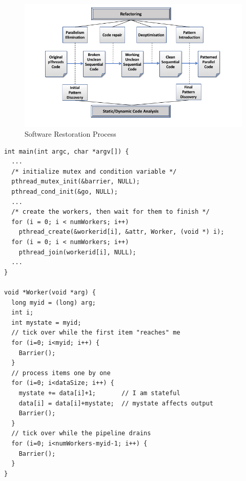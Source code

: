 \begin{figure}
\centering
\includegraphics[width=\textwidth]{images/HLPP2020Paper.png}
\caption{Software Restoration Process}
\label{fig:SoftRest}
\end{figure}

\begin{lstlisting}[caption=Original Simple Pipeline Code,frame=single,label=lst:simplePipe]
int main(int argc, char *argv[]) {
  ...
  /* initialize mutex and condition variable */
  pthread_mutex_init(&barrier, NULL);
  pthread_cond_init(&go, NULL);
  ...
  /* create the workers, then wait for them to finish */
  for (i = 0; i < numWorkers; i++)
    pthread_create(&workerid[i], &attr, Worker, (void *) i);
  for (i = 0; i < numWorkers; i++)
    pthread_join(workerid[i], NULL);
  ...
}

void *Worker(void *arg) {
  long myid = (long) arg;
  int i;
  int mystate = myid;
  // tick over while the first item "reaches" me
  for (i=0; i<myid; i++) {
    Barrier();
  }
  // process items one by one
  for (i=0; i<dataSize; i++) {
    mystate += data[i]+1;       // I am stateful
    data[i] = data[i]+mystate;  // mystate affects output
    Barrier();
  }
  // tick over while the pipeline drains
  for (i=0; i<numWorkers-myid-1; i++) {
    Barrier();
  }
}
\end{lstlisting}

